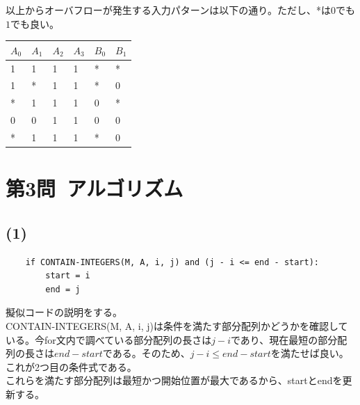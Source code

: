 \documentclass[a4paper,12pt,xelatex,ja=standard]{bxjsarticle}
\begin{document}
  以上からオーバフローが発生する入力パターンは以下の通り。ただし、*は$0$でも$1$でも良い。
  \begin{center}
    \centering
    \begin{tabular}{ |l|l|l|l|l|l| }
    \hline
    $A_0$ & $A_1$ & $A_2$ & $A_3$ & $B_0$ & $B_1$ \\ \hline \hline
    1  & 1  & 1  & 1  & *  & *  \\ \hline
    1  & *  & 1  & 1  & *  & 0  \\ \hline
    *  & 1  & 1  & 1  & 0  & *  \\ \hline
    0  & 0  & 1  & 1  & 0  & 0  \\ \hline
    *  & 1  & 1  & 1  & *  & 0  \\ \hline
    \end{tabular}
  \end{center}

\section*{第3問\ アルゴリズム}
  \subsection*{(1)}
  \begin{lstlisting}
    if CONTAIN-INTEGERS(M, A, i, j) and (j - i <= end - start):
        start = i
        end = j
  \end{lstlisting}
  擬似コードの説明をする。\\
  CONTAIN-INTEGERS(M, A, i, j)は条件を満たす部分配列かどうかを確認している。今for文内で調べている部分配列の長さは$j-i$であり、現在最短の部分配列の長さは$end-start$である。そのため、$j-i \leq end-start$を満たせば良い。これが2つ目の条件式である。\\
  これらを満たす部分配列は最短かつ開始位置が最大であるから、startとendを更新する。
\end{document}
